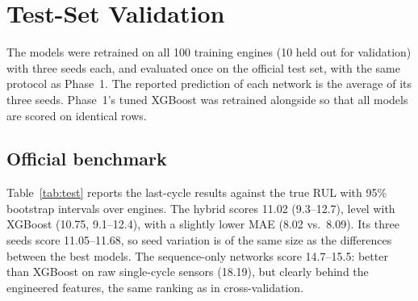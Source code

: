 \section{Test-Set Validation}\label{sec:test}
The models were retrained on all 100 training engines (10 held out for validation) with three seeds each, and evaluated once on the official test set, with the same protocol as Phase~1. The reported prediction of each network is the average of its three seeds. Phase~1's tuned XGBoost was retrained alongside so that all models are scored on identical rows.

\subsection{Official benchmark}
Table~\ref{tab:test} reports the last-cycle results against the true RUL with 95\% bootstrap intervals over engines. The hybrid scores 11.02 (9.3--12.7), level with XGBoost (10.75, 9.1--12.4), with a slightly lower MAE (8.02 vs.\ 8.09). Its three seeds score 11.05--11.68, so seed variation is of the same size as the differences between the best models. The sequence-only networks score 14.7--15.5: better than XGBoost on raw single-cycle sensors (18.19), but clearly behind the engineered features, the same ranking as in cross-validation.

\begin{table}[t]
\centering
\small
\setlength{\tabcolsep}{4pt}
\caption{Official FD001 test set (last cycle, true RUL)}
\label{tab:test}
\end{table}

